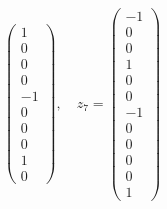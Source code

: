 \begin{loesung}
\[\begin{pmatrix}
 1\\
 0\\
 0\\
 0\\
-1\\
 0\\
 0\\
 0\\
 1\\
 0
\end{pmatrix}
,\quad
z_7=\begin{pmatrix}
-1\\
 0\\
 0\\
 1\\
 0\\
 0\\
-1\\
 0\\
 0\\
 0\\
 0\\
 1
\end{pmatrix}
\]

\end{loesung}
